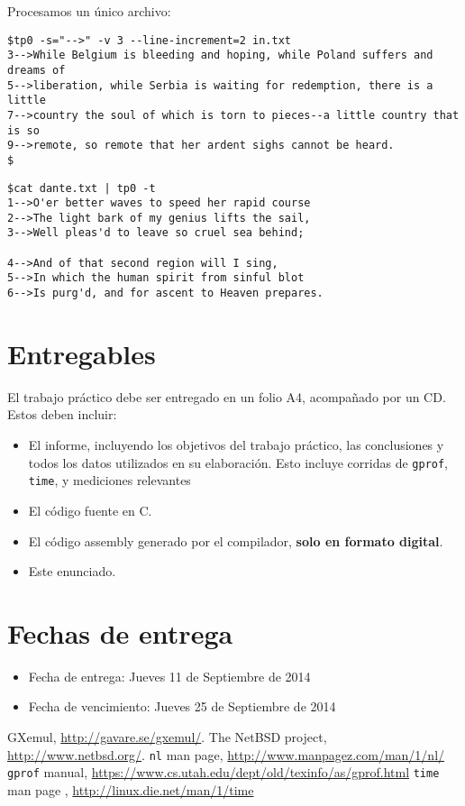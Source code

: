 \documentclass[9pt,a4paper]{article}
\newcommand{\gprof}{\texttt{gprof}}
\newcommand{\nl}{\texttt{nl}}
\newcommand{\unixtime}{\texttt{time}}
\begin{document}
\noindent
Procesamos un único archivo:
\begin{small}
\begin{verbatim}
$tp0 -s="-->" -v 3 --line-increment=2 in.txt
3-->While Belgium is bleeding and hoping, while Poland suffers and dreams of
5-->liberation, while Serbia is waiting for redemption, there is a little
7-->country the soul of which is torn to pieces--a little country that is so
9-->remote, so remote that her ardent sighs cannot be heard.
$
\end{verbatim}
\end{small}

\begin{small}
\begin{verbatim}
$cat dante.txt | tp0 -t
1-->O'er better waves to speed her rapid course
2-->The light bark of my genius lifts the sail,
3-->Well pleas'd to leave so cruel sea behind;

4-->And of that second region will I sing,
5-->In which the human spirit from sinful blot
6-->Is purg'd, and for ascent to Heaven prepares.
\end{verbatim}
\end{small}


\section{Entregables}
El trabajo práctico debe ser entregado en un folio A4, acompañado por un CD. Estos
deben incluir:
\begin{itemize}
\item El informe, incluyendo los objetivos del trabajo práctico, las conclusiones y todos los 
datos utilizados en su elaboración. Esto incluye corridas de \gprof, \unixtime, y mediciones relevantes
\item El código fuente en C.
\item El código assembly generado por el compilador, \textbf{solo en formato digital}.
\item Este enunciado.
\end{itemize}

\section{Fechas de entrega}
\begin{itemize}
\item Fecha de entrega: Jueves 11 de Septiembre de 2014
\item Fecha de vencimiento: Jueves 25 de Septiembre de 2014
\end{itemize}

\begin{thebibliography}{99}
  GXemul, \url{http://gavare.se/gxemul/}.
  The NetBSD project, \url{http://www.netbsd.org/}.
\nl{} man page, \url{http://www.manpagez.com/man/1/nl/}
 \gprof{} manual, \url{https://www.cs.utah.edu/dept/old/texinfo/as/gprof.html}
 \unixtime{} man page  , \url{http://linux.die.net/man/1/time}
\end{thebibliography}
\end{document}
